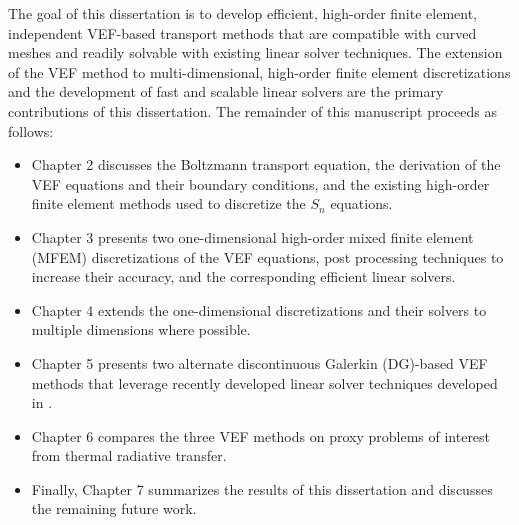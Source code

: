 \documentclass[../doc.tex]{subfiles}
\begin{document}
The goal of this dissertation is to develop efficient, high-order finite element, independent VEF-based transport methods that are compatible with curved meshes and readily solvable with existing linear solver techniques. The extension of the VEF method to multi-dimensional, high-order finite element discretizations and the development of fast and scalable linear solvers are the primary contributions of this dissertation. The remainder of this manuscript proceeds as follows: 
	\begin{itemize}
		\item Chapter 2 discusses the Boltzmann transport equation, the derivation of the VEF equations and their boundary conditions, and the existing high-order finite element methods used to discretize the $S_n$ equations. 
		\item Chapter 3 presents two one-dimensional high-order mixed finite element (MFEM) discretizations of the VEF equations, post processing techniques to increase their accuracy, and the corresponding efficient linear solvers. 
		\item Chapter 4 extends the one-dimensional discretizations and their solvers to multiple dimensions where possible.
		\item Chapter 5 presents two alternate discontinuous Galerkin (DG)-based VEF methods that leverage recently developed linear solver techniques developed in \cite{pazner_usc}. 
		\item Chapter 6 compares the three VEF methods on proxy problems of interest from thermal radiative transfer.
		\item Finally, Chapter 7 summarizes the results of this dissertation and discusses the remaining future work. 
	\end{itemize}

\end{document}
